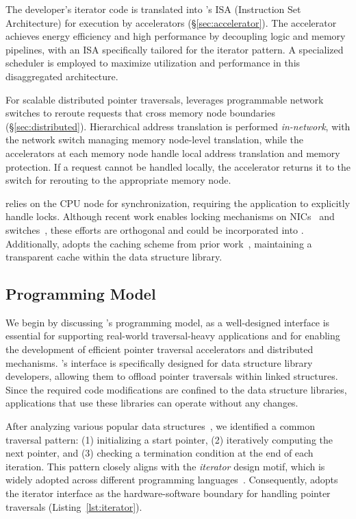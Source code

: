 The developer's iterator code is translated into \pulse's ISA (Instruction Set Architecture) for execution by \pulse accelerators (\S\ref{sec:accelerator}). The accelerator achieves energy efficiency and high performance by decoupling logic and memory pipelines, with an ISA specifically tailored for the iterator pattern. A specialized scheduler is employed to maximize utilization and performance in this disaggregated architecture.

For scalable distributed pointer traversals, \pulse leverages programmable network switches to reroute requests that cross memory node boundaries (\S\ref{sec:distributed}). Hierarchical address translation is performed \emph{in-network}, with the network switch managing memory node-level translation, while the accelerators at each memory node handle local address translation and memory protection. If a request cannot be handled locally, the accelerator returns it to the switch for rerouting to the appropriate memory node.

 \pulse relies on the CPU node for synchronization, requiring the application to explicitly handle locks. Although recent work enables locking mechanisms on NICs~\cite{sherman, clover} and switches~\cite{netlock}, these efforts are orthogonal and could be incorporated into \pulse. Additionally, \pulse adopts the caching scheme from prior work~\cite{aifm}, maintaining a transparent cache within the data structure library.



\subsection{\pulse Programming Model}
\label{ssec:interface}
We begin by discussing \pulse's programming model, as a well-designed interface is essential for supporting real-world traversal-heavy applications and for enabling the development of efficient pointer traversal accelerators and distributed mechanisms. \pulse's interface is specifically designed for data structure library developers, allowing them to offload pointer traversals within linked structures. Since the required code modifications are confined to the data structure libraries, applications that use these libraries can operate without any changes.

After analyzing various popular data structures~\cite{stl, boost, javaiterator, c++iterator}, we identified a common traversal pattern: (1) initializing a start pointer, (2) iteratively computing the next pointer, and (3) checking a termination condition at the end of each iteration. This pattern closely aligns with the \emph{iterator} design motif, which is widely adopted across different programming languages~\cite{javaiterator}. Consequently, \pulse adopts the iterator interface as the hardware-software boundary for handling pointer traversals (Listing~\ref{lst:iterator}).


